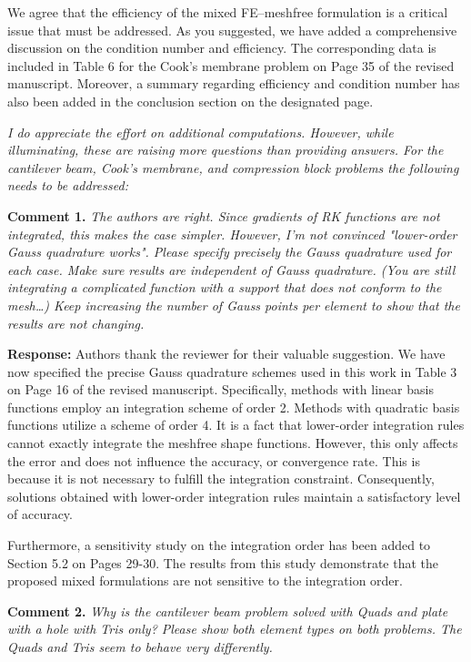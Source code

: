 \documentclass{article}
\begin{document}
We agree that the efficiency of the mixed FE--meshfree formulation is a critical issue that must be addressed.
As you suggested, we have added a comprehensive discussion on the condition number and efficiency.
The corresponding data is included in Table 6 for the Cook's membrane problem on Page 35 of the revised manuscript.
Moreover, a summary regarding efficiency and condition number has also been added in the conclusion section on the designated page.

\textit{I do appreciate the effort on additional computations. However, while illuminating, these are raising more questions than providing answers. For the cantilever beam, Cook's membrane, and compression block problems the following needs to be addressed:}

\textbf{Comment 1.} \textit{The authors are right. Since gradients of RK functions are not integrated, this makes the case simpler. However, I'm not convinced "lower-order Gauss quadrature works". Please specify precisely the Gauss quadrature used for each case. Make sure results are independent of Gauss quadrature. (You are still integrating a complicated function with a support that does not conform to the mesh…) Keep increasing the number of Gauss points per element to show that the results are not changing.}

\textbf{Response:} 
Authors thank the reviewer for their valuable suggestion.
We have now specified the precise Gauss quadrature schemes used in this work in Table 3 on Page 16 of the revised manuscript.
Specifically, methods with linear basis functions employ an integration scheme of order 2.
Methods with quadratic basis functions utilize a scheme of order 4.
It is a fact that lower-order integration rules cannot exactly integrate the meshfree shape functions.
However, this only affects the error and does not influence the accuracy, or convergence rate.
This is because it is not necessary to fulfill the integration constraint.
Consequently, solutions obtained with lower-order integration rules maintain a satisfactory level of accuracy.

Furthermore, a sensitivity study on the integration order has been added to Section 5.2 on Pages 29-30.
The results from this study demonstrate that the proposed mixed formulations are not sensitive to the integration order.

\textbf{Comment 2.} \textit{Why is the cantilever beam problem solved with Quads and plate with a hole with Tris only? Please show both element types on both problems. The Quads and Tris seem to behave very differently.}
\end{document}
